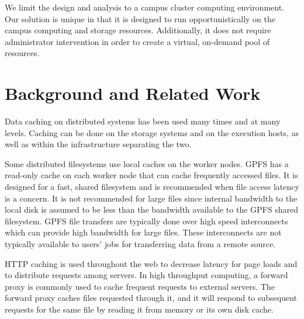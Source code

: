 
 


We limit the design and analysis to a campus cluster computing environment.  Our solution is unique in that it is designed to run opportunistically on the campus computing and storage resources.  Additionally, it does not require administrator intervention in order to create a virtual, on-demand pool of resources.


\section{Background and Related Work}


Data caching on distributed systems has been used many times and at many levels.  Caching can be done on the storage systems and on the execution hosts, as well as within the infrastructure separating the two.

Some distributed filesystems use local caches on the worker nodes.  GPFS \cite{schmuck2002gpfs} has a read-only cache on each worker node that can cache frequently accessed files.  It is designed for a fast, shared filesystem and is recommended when file access latency is a concern.  It is not recommended for large files since internal bandwidth to the local disk is assumed to be less than the bandwidth available to the GPFS shared filesystem.  GPFS file transfers are typically done over high speed interconnects which can provide high bandwidth for large files.  These interconnects are not typically available to users' jobs for transferring data from a remote source.


HTTP caching is used throughout the web to decrease latency for page loads and to distribute requests among servers.  In high throughput computing, a forward proxy is commonly used to cache frequent requests to external servers.  The forward proxy caches files requested through it, and it will respond to subsequent requests for the same file by reading it from memory or its own disk cache.

